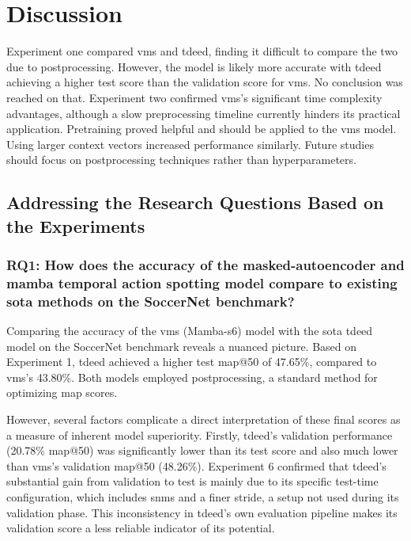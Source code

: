 \chapter{Discussion}
\label{chap:discussion}

Experiment one compared \acrfull{vms} and \acrfull{tdeed}, finding it difficult to compare the two due to postprocessing. However, the model is likely more accurate with \acrshort{tdeed} achieving a higher test score than the validation score for \acrshort{vms}. No conclusion was reached on that. Experiment two confirmed \acrshort{vms}'s significant time complexity advantages, although a slow preprocessing timeline currently hinders its practical application. Pretraining proved helpful and should be applied to the \acrshort{vms} model. Using larger context vectors increased performance similarly. Future studies should focus on postprocessing techniques rather than hyperparameters. 

\section{Addressing the Research Questions Based on the Experiments}
\label{sec:addressing_rq_based_on_experiments}

\subsection{RQ1: How does the accuracy of the masked-autoencoder and mamba temporal action spotting model compare to existing \acrfull{sota} methods on the SoccerNet benchmark?}

Comparing the accuracy of the \acrshort{vms} (Mamba-\acrshort{s6}) model with the \acrshort{sota} \acrshort{tdeed} model on the SoccerNet benchmark reveals a nuanced picture. Based on Experiment 1, \acrshort{tdeed} achieved a higher test \acrshort{map}@50 of 47.65\%, compared to \acrshort{vms}'s 43.80\%. Both models employed postprocessing, a standard method for optimizing \acrshort{map} scores.

However, several factors complicate a direct interpretation of these final scores as a measure of inherent model superiority. Firstly, \acrshort{tdeed}'s validation performance (20.78\% \acrshort{map}@50) was significantly lower than its test score and also much lower than \acrshort{vms}'s validation \acrshort{map}@50 (48.26\%). Experiment 6 confirmed that \acrshort{tdeed}'s substantial gain from validation to test is mainly due to its specific test-time configuration, which includes \acrfull{snms} and a finer stride, a setup not used during its validation phase. This inconsistency in \acrshort{tdeed}'s own evaluation pipeline makes its validation score a less reliable indicator of its potential.

